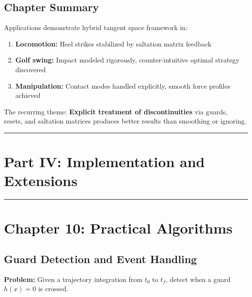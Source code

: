 \documentclass[
  letterpaper,
  DIV=11,
  numbers=noendperiod]{scrartcl}
\providecommand{\tightlist}{%
  \setlength{\itemsep}{0pt}\setlength{\parskip}{0pt}}\usepackage{longtable,booktabs,array}
\begin{document}
\subsection{Chapter Summary}\label{chapter-summary-6}

Applications demonstrate hybrid tangent space framework in:

\begin{enumerate}
\def\labelenumi{\arabic{enumi}.}
\tightlist
\item
  \textbf{Locomotion:} Heel strikes stabilized by saltation matrix
  feedback
\item
  \textbf{Golf swing:} Impact modeled rigorously, counter-intuitive
  optimal strategy discovered
\item
  \textbf{Manipulation:} Contact modes handled explicitly, smooth force
  profiles achieved
\end{enumerate}

The recurring theme: \textbf{Explicit treatment of discontinuities} via
guards, resets, and saltation matrices produces better results than
smoothing or ignoring.

\begin{center}\rule{0.5\linewidth}{0.5pt}\end{center}

\section*{Part IV: Implementation and
Extensions}\label{part-iv-implementation-and-extensions}

\begin{center}\rule{0.5\linewidth}{0.5pt}\end{center}

\section{Chapter 10: Practical Algorithms}\label{sec-implementation}

\subsection{Guard Detection and Event
Handling}\label{guard-detection-and-event-handling}

\textbf{Problem:} Given a trajectory integration from \(t_0\) to
\(t_f\), detect when a guard \(h(x) = 0\) is crossed.
\end{document}
